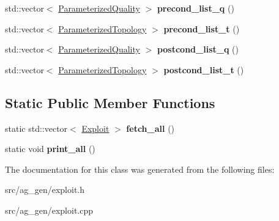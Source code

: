 \begin{DoxyCompactItemize}
std\+::vector$<$ \mbox{\hyperlink{struct_parameterized_quality}{Parameterized\+Quality}} $>$ {\bfseries precond\+\_\+list\+\_\+q} ()
\item 
\mbox{\label{class_exploit_a430135c7ea3e331c2b1f1b277aed9278}} 
std\+::vector$<$ \mbox{\hyperlink{class_parameterized_topology}{Parameterized\+Topology}} $>$ {\bfseries precond\+\_\+list\+\_\+t} ()
\item 
\mbox{\label{class_exploit_af72537cd66352048f9781f02abf4f7a0}} 
std\+::vector$<$ \mbox{\hyperlink{struct_parameterized_quality}{Parameterized\+Quality}} $>$ {\bfseries postcond\+\_\+list\+\_\+q} ()
\item 
\mbox{\label{class_exploit_a09e724bafe4dfb7887cb007faf4aae8b}} 
std\+::vector$<$ \mbox{\hyperlink{class_parameterized_topology}{Parameterized\+Topology}} $>$ {\bfseries postcond\+\_\+list\+\_\+t} ()
\end{DoxyCompactItemize}
\subsection*{Static Public Member Functions}
\begin{DoxyCompactItemize}
\item 
\mbox{\label{class_exploit_a065f720bb655c3cd2419120dfb278423}} 
static std\+::vector$<$ \mbox{\hyperlink{class_exploit}{Exploit}} $>$ {\bfseries fetch\+\_\+all} ()
\item 
\mbox{\label{class_exploit_a9881ee99b10cf520d33b8039af28289c}} 
static void {\bfseries print\+\_\+all} ()
\end{DoxyCompactItemize}


The documentation for this class was generated from the following files\+:\begin{DoxyCompactItemize}
\item 
src/ag\+\_\+gen/exploit.\+h\item 
src/ag\+\_\+gen/exploit.\+cpp\end{DoxyCompactItemize}

